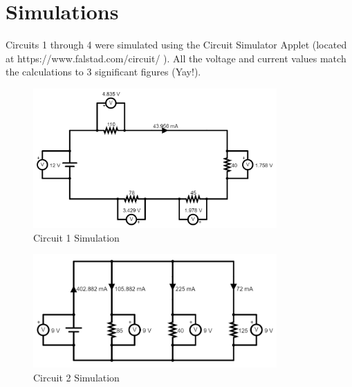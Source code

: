 \documentclass[12pt]{iopart} %
\begin{document}
\section{Simulations}

Circuits 1 through 4 were simulated using the Circuit Simulator Applet (located at https://www.falstad.com/circuit/ ).
All the voltage and current values match the calculations to 3 significant figures (Yay!).

\begin{figure}[htbp]
  \begin{indented}
  \item[]\includegraphics[width=0.83\textwidth]{media/circuit-1-simulation.png}
  \end{indented}
  \caption{\label{fig:circuit_1_simulation}
  Circuit 1 Simulation
  }
\end{figure}

\begin{figure}[htbp]
  \begin{indented}
  \item[]\includegraphics[width=0.83\textwidth]{media/circuit-2-simulation.png}
  \end{indented}
  \caption{\label{fig:circuit_2_simulation}
  Circuit 2 Simulation
  }
\end{figure}
\end{document}
